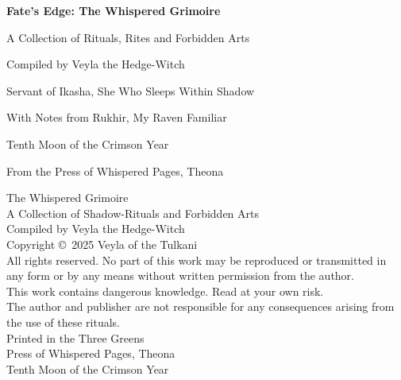\documentclass[12pt,twoside]{book}
\begin{document}
\frontmatter

\begin{titlepage}
\centering
\vspace*{2cm}
{\Huge\bfseries Fate's Edge: The Whispered Grimoire\par}
\vspace{1cm}
{\Large A Collection of Rituals, Rites and Forbidden Arts\par}
\vspace{2cm}
{\Large Compiled by Veyla the Hedge-Witch\par}
\vspace{0.5cm}
{\large Servant of Ikasha, She Who Sleeps Within Shadow\par}
\vspace{1cm}
{\large With Notes from Rukhir, My Raven Familiar\par}
\vspace{3cm}
{\large Tenth Moon of the Crimson Year\par}
\vspace{0.5cm}
{\large From the Press of Whispered Pages, Theona\par}
\end{titlepage}

\newpage
\thispagestyle{empty}
\vspace*{5cm}
\begin{center}
{\small
The Whispered Grimoire\\
A Collection of Shadow-Rituals and Forbidden Arts\\
\vspace{0.5cm}
Compiled by Veyla the Hedge-Witch\\
\vspace{1cm}
Copyright \copyright\ 2025 Veyla of the Tulkani\\
All rights reserved. No part of this work may be reproduced or transmitted in any form or by any means without written permission from the author.\\
\vspace{1cm}
This work contains dangerous knowledge. Read at your own risk.\\
The author and publisher are not responsible for any consequences arising from the use of these rituals.\\
\vspace{1cm}
Printed in the Three Greens\\
Press of Whispered Pages, Theona\\
Tenth Moon of the Crimson Year
}
\end{center}
\end{document}
